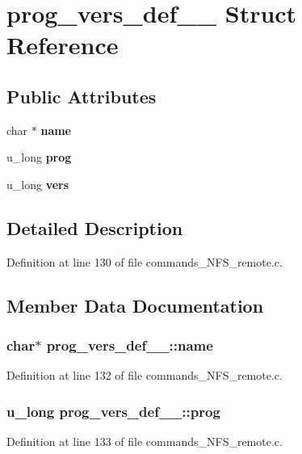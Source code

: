 \section{prog\_\-vers\_\-def\_\-\_\- Struct Reference}
\label{structprog__vers__def____}
\subsection*{Public Attributes}
\begin{DoxyCompactItemize}
\item 
char $\ast$ {\bf name}
\item 
u\_\-long {\bf prog}
\item 
u\_\-long {\bf vers}
\end{DoxyCompactItemize}


\subsection{Detailed Description}


Definition at line 130 of file commands\_\-NFS\_\-remote.c.

\subsection{Member Data Documentation}
\subsubsection[{name}]{\setlength{\rightskip}{0pt plus 5cm}char$\ast$ {\bf prog\_\-vers\_\-def\_\-\_\-::name}}\label{structprog__vers__def_____a6e2b1520b80eae4bf5e021627573e14d}


Definition at line 132 of file commands\_\-NFS\_\-remote.c.
\subsubsection[{prog}]{\setlength{\rightskip}{0pt plus 5cm}u\_\-long {\bf prog\_\-vers\_\-def\_\-\_\-::prog}}\label{structprog__vers__def_____a0f0b9160c7fc6013b79add5dd696ed43}


Definition at line 133 of file commands\_\-NFS\_\-remote.c.
